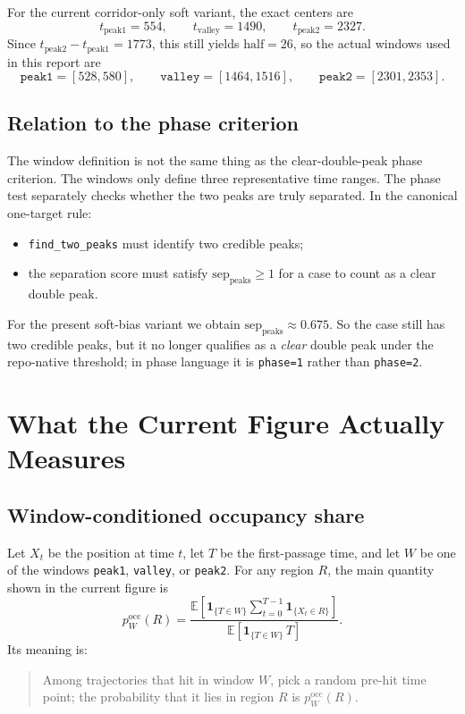 \documentclass[11pt]{article}
\begin{document}
For the current corridor-only soft variant, the exact centers are
\[
t_{\mathrm{peak1}}=554,\qquad t_{\mathrm{valley}}=1490,\qquad t_{\mathrm{peak2}}=2327.
\]
Since $t_{\mathrm{peak2}}-t_{\mathrm{peak1}}=1773$, this still yields $\mathrm{half}=26$, so the actual windows used in this report are
\[
\texttt{peak1}=[528,580],\qquad
\texttt{valley}=[1464,1516],\qquad
\texttt{peak2}=[2301,2353].
\]

\subsection{Relation to the phase criterion}
The window definition is not the same thing as the clear-double-peak phase criterion. The windows only define three representative time ranges. The phase test separately checks whether the two peaks are truly separated. In the canonical one-target rule:
\begin{itemize}
  \item \texttt{find\_two\_peaks} must identify two credible peaks;
  \item the separation score must satisfy \(\mathrm{sep}_{\mathrm{peaks}}\ge 1\) for a case to count as a clear double peak.
\end{itemize}
For the present soft-bias variant we obtain \(\mathrm{sep}_{\mathrm{peaks}}\approx 0.675\). So the case still has two credible peaks, but it no longer qualifies as a \emph{clear} double peak under the repo-native threshold; in phase language it is \texttt{phase=1} rather than \texttt{phase=2}.

\section{What the Current Figure Actually Measures}
\subsection{Window-conditioned occupancy share}
Let $X_t$ be the position at time $t$, let $T$ be the first-passage time, and let $W$ be one of the windows \texttt{peak1}, \texttt{valley}, or \texttt{peak2}. For any region $R$, the main quantity shown in the current figure is
\[
p^{\mathrm{occ}}_W(R)
=
\frac{
\mathbb{E}\!\left[
\mathbf{1}_{\{T\in W\}}
\sum_{t=0}^{T-1}\mathbf{1}_{\{X_t\in R\}}
\right]
}{
\mathbb{E}\!\left[
\mathbf{1}_{\{T\in W\}}\,T
\right]
}.
\]
Its meaning is:
\begin{quote}
Among trajectories that hit in window $W$, pick a random pre-hit time point; the probability that it lies in region $R$ is \(p^{\mathrm{occ}}_W(R)\).
\end{quote}
\end{document}
